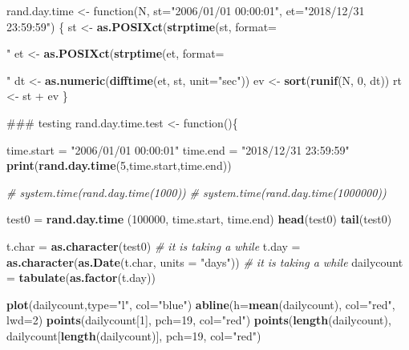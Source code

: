 \documentclass[]{article}
\newenvironment{Shaded}{\begin{snugshade}}{\end{snugshade}}
\newcommand{\KeywordTok}[1]{\textcolor[rgb]{0.13,0.29,0.53}{\textbf{{#1}}}}
\newcommand{\DataTypeTok}[1]{\textcolor[rgb]{0.13,0.29,0.53}{{#1}}}
\newcommand{\DecValTok}[1]{\textcolor[rgb]{0.00,0.00,0.81}{{#1}}}
\newcommand{\StringTok}[1]{\textcolor[rgb]{0.31,0.60,0.02}{{#1}}}
\newcommand{\CommentTok}[1]{\textcolor[rgb]{0.56,0.35,0.01}{\textit{{#1}}}}
\newcommand{\NormalTok}[1]{{#1}}
\begin{document}
\begin{Shaded}
\begin{Highlighting}[]
\NormalTok{rand.day.time <-}\StringTok{ }\NormalTok{function(N, }\DataTypeTok{st=}\StringTok{"2006/01/01 00:00:01"}\NormalTok{, }\DataTypeTok{et=}\StringTok{"2018/12/31 23:59:59"}\NormalTok{) \{}
         \NormalTok{st <-}\StringTok{ }\KeywordTok{as.POSIXct}\NormalTok{(}\KeywordTok{strptime}\NormalTok{(st, }\DataTypeTok{format=}\StringTok{"%Y/%m/%d %H:%M:%S"}\NormalTok{, }\DataTypeTok{tz=}\StringTok{"Pacific/Auckland"}\NormalTok{))}
         \NormalTok{et <-}\StringTok{ }\KeywordTok{as.POSIXct}\NormalTok{(}\KeywordTok{strptime}\NormalTok{(et, }\DataTypeTok{format=}\StringTok{"%Y/%m/%d %H:%M:%S"}\NormalTok{, }\DataTypeTok{tz=}\StringTok{"Pacific/Auckland"}\NormalTok{))}
       \NormalTok{dt <-}\StringTok{ }\KeywordTok{as.numeric}\NormalTok{(}\KeywordTok{difftime}\NormalTok{(et, st, }\DataTypeTok{unit=}\StringTok{"sec"}\NormalTok{))}
       \NormalTok{ev <-}\StringTok{ }\KeywordTok{sort}\NormalTok{(}\KeywordTok{runif}\NormalTok{(N, }\DecValTok{0}\NormalTok{, dt))}
       \NormalTok{rt <-}\StringTok{ }\NormalTok{st +}\StringTok{ }\NormalTok{ev}
\NormalTok{\}}

\NormalTok{### testing}
\NormalTok{rand.day.time.test <-}\StringTok{ }\NormalTok{function()\{}

\NormalTok{time.start =}\StringTok{ "2006/01/01 00:00:01"}
\NormalTok{time.end =}\StringTok{ "2018/12/31 23:59:59"}
\KeywordTok{print}\NormalTok{(}\KeywordTok{rand.day.time}\NormalTok{(}\DecValTok{5}\NormalTok{,time.start,time.end)) }

\CommentTok{# system.time(rand.day.time(1000))}
\CommentTok{# system.time(rand.day.time(1000000))}

\NormalTok{test0 =}\StringTok{ }\KeywordTok{rand.day.time} \NormalTok{(}\DecValTok{100000}\NormalTok{, time.start, time.end)}
\KeywordTok{head}\NormalTok{(test0)}
\KeywordTok{tail}\NormalTok{(test0)}

\NormalTok{t.char =}\StringTok{ }\KeywordTok{as.character}\NormalTok{(test0)                           }\CommentTok{# it is taking a while}
\NormalTok{t.day =}\StringTok{ }\KeywordTok{as.character}\NormalTok{(}\KeywordTok{as.Date}\NormalTok{(t.char, }\DataTypeTok{units =} \StringTok{"days"}\NormalTok{))  }\CommentTok{# it is taking a while}
\NormalTok{dailycount =}\StringTok{ }\KeywordTok{tabulate}\NormalTok{(}\KeywordTok{as.factor}\NormalTok{(t.day))}

\KeywordTok{plot}\NormalTok{(dailycount,}\DataTypeTok{type=}\StringTok{"l"}\NormalTok{, }\DataTypeTok{col=}\StringTok{"blue"}\NormalTok{)}
\KeywordTok{abline}\NormalTok{(}\DataTypeTok{h=}\KeywordTok{mean}\NormalTok{(dailycount), }\DataTypeTok{col=}\StringTok{"red"}\NormalTok{, }\DataTypeTok{lwd=}\DecValTok{2}\NormalTok{)}
\KeywordTok{points}\NormalTok{(dailycount[}\DecValTok{1}\NormalTok{], }\DataTypeTok{pch=}\DecValTok{19}\NormalTok{, }\DataTypeTok{col=}\StringTok{"red"}\NormalTok{)}
\KeywordTok{points}\NormalTok{(}\KeywordTok{length}\NormalTok{(dailycount), dailycount[}\KeywordTok{length}\NormalTok{(dailycount)], }\DataTypeTok{pch=}\DecValTok{19}\NormalTok{, }\DataTypeTok{col=}\StringTok{"red"}\NormalTok{)}

}}
\end{Highlighting}
\end{Shaded}
\end{document}
